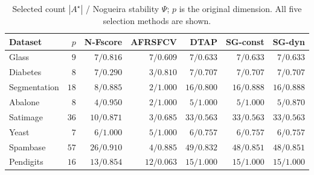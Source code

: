 \documentclass[]{interact}
\theoremstyle{plain}
\theoremstyle{definition}
\theoremstyle{remark}
\begin{document}
\begin{table}[htbp]
\centering\small\setlength{\tabcolsep}{4pt}
\caption{Selected count $|A^\star|$ / Nogueira stability $\Psi$; $p$ is the original dimension. All five selection methods are shown.}\label{tab:nfeat}
\begin{tabular}{lrrrrrr}
\toprule
Dataset & $p$ & N-Fscore & AFRSFCV & DTAP & SG-const & SG-dyn \\
\midrule
Glass & $9$ & $7/0.816$ & $7/0.609$ & $7/0.633$ & $7/0.633$ & $7/0.633$ \\
Diabetes & $8$ & $7/0.290$ & $3/0.810$ & $7/0.707$ & $7/0.707$ & $7/0.707$ \\
Segmentation & $18$ & $8/0.885$ & $2/1.000$ & $16/0.800$ & $16/0.888$ & $16/0.888$ \\
Abalone & $8$ & $4/0.950$ & $2/1.000$ & $5/1.000$ & $5/1.000$ & $5/0.870$ \\
Satimage & $36$ & $10/0.871$ & $3/0.685$ & $33/0.563$ & $33/0.563$ & $33/0.563$ \\
Yeast & $7$ & $6/1.000$ & $5/1.000$ & $6/0.757$ & $6/0.757$ & $6/0.757$ \\
Spambase & $57$ & $26/0.910$ & $4/0.885$ & $49/0.832$ & $48/0.851$ & $48/0.851$ \\
Pendigits & $16$ & $13/0.854$ & $12/0.063$ & $15/1.000$ & $15/1.000$ & $15/1.000$ \\
\bottomrule
\end{tabular}

\end{table}
\end{document}
